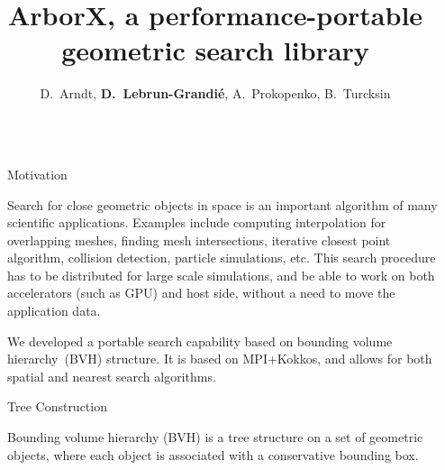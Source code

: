 \documentclass[final,hyperref={pdfpagelabels=false}]{beamer}
\title{\huge ArborX, a performance-portable geometric search library}
\author{D.~Arndt, \textbf{D.~Lebrun-Grandi{\'e}}, A.~Prokopenko, B.~Turcksin}
\institute{Oak Ridge National Laboratory}
\begin{document}

\begin{frame}[t,fragile]

\begin{columns}[t]

\begin{column}{.02\textwidth}\end{column}

\begin{column}{.450\textwidth}

\begin{block}{\centering Motivation}

  Search for close geometric objects in space is an important algorithm of many
  scientific applications.
  Examples include computing interpolation for overlapping meshes, finding
  mesh intersections, iterative closest point algorithm, collision detection, particle simulations, etc.
  This search procedure has to be distributed for large scale simulations, and
  be able to work on both accelerators (such as GPU) and host side, without a
  need to move the application data.

  We developed a portable search capability based on bounding volume
  hierarchy~(BVH) structure. It is based on MPI+Kokkos, and allows for both
  spatial and nearest search algorithms.
\end{block}

\begin{block}{\centering Tree Construction}

  Bounding volume hierarchy (BVH) is a tree structure on a set of geometric
  objects, where each object is associated with a conservative bounding box.


\end{block}
\end{column}
\end{columns}
\end{frame}
\end{document}
